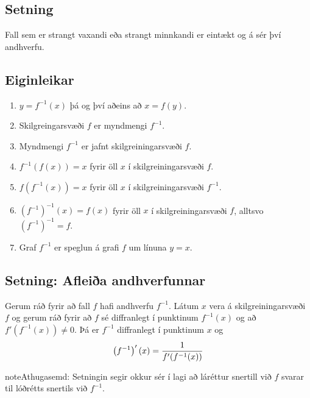 \documentclass[a4paper,10pt,icelandic]{sphinxmanual}
\begin{document}
\subsection{Setning}
\label{kafli03:id20}
Fall sem er strangt vaxandi eða strangt minnkandi er eintækt og á sér
því andhverfu.


\subsection{Eiginleikar}
\label{kafli03:eiginleikar}\begin{enumerate}
\item {} 
\(y=f^{-1}(x)\) þá og því aðeins að \(x=f(y)\).

\item {} 
Skilgreingarsvæði \(f\) er myndmengi \(f^{-1}\).

\item {} 
Myndmengi \(f^{-1}\) er jafnt skilgreiningarsvæði \(f\).

\item {} 
\(f^{-1}(f(x))=x\) fyrir öll \(x\) í skilgreiningarsvæði
\(f\).

\item {} 
\(f(f^{-1}(x))=x\) fyrir öll \(x\) í skilgreiningarsvæði
\(f^{-1}\).

\item {} 
\((f^{-1})^{-1}(x)=f(x)\) fyrir öll \(x\) í
skilgreiningarsvæði \(f\), alltsvo \((f^{-1})^{-1}=f\).

\item {} 
Graf \(f^{-1}\) er speglun á grafi \(f\) um línuna
\(y=x\).

\end{enumerate}


\subsection{Setning: Afleiða andhverfunnar}
\label{kafli03:setning-afleia-andhverfunnar}\label{kafli03:index-12}
Gerum ráð fyrir að fall \(f\) hafi andhverfu \(f^{-1}\). Látum
\(x\) vera á skilgreiningarsvæði \(f\) og gerum ráð fyrir að
\(f\) sé diffranlegt í punktinum \(f^{-1}(x)\) og að
\(f'(f^{-1}(x))\neq 0\). Þá er \(f^{-1}\) diffranlegt í
punktinum \(x\) og
\begin{gather}
\begin{split}\left(f^{-1}\right)'(x)=\frac{1}{f'(f^{-1}(x))}\end{split}\notag
\end{gather}
\begin{notice}{note}{Athugasemd:}
Setningin segir okkur sér í lagi að láréttur snertill við \(f\)
svarar til lóðrétts snertils við \(f^{-1}\).
\end{notice}
\end{document}
